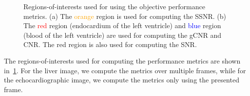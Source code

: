 %
\begin{figure}[h]
  \centering
  \caption{Regions-of-interests used for using the objective performance metrics.
    (a) The \textcolor{orange}{orange} region is used for computing the SSNR.
    (b) The \textcolor{red}{red} region (endocardium of the left ventricle) and \textcolor{blue}{blue} region (blood of the left ventricle) are used for computing the gCNR and CNR.
    The red region is also used for computing the SNR.
  }\label{fig:roi}
\end{figure}
% 
The regions-of-interests used for computing the performance metrics are shown in~\cref{fig:roi}.
For the liver image, we compute the metrics over multiple frames, while for the echocardiographic image, we compute the metrics only using the presented frame.

